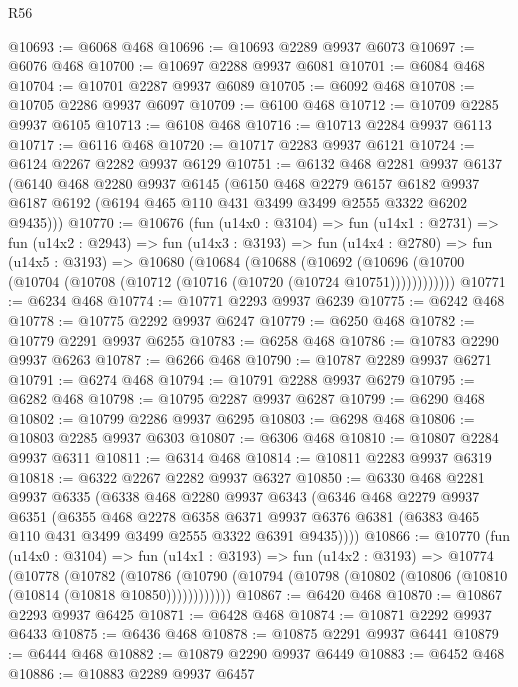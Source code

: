 \begin{lexlean}{R56}
\begin{coremodule}
@10693 := @6068 @468
@10696 := @10693 @2289 @9937 @6073
@10697 := @6076 @468
@10700 := @10697 @2288 @9937 @6081
@10701 := @6084 @468
@10704 := @10701 @2287 @9937 @6089
@10705 := @6092 @468
@10708 := @10705 @2286 @9937 @6097
@10709 := @6100 @468
@10712 := @10709 @2285 @9937 @6105
@10713 := @6108 @468
@10716 := @10713 @2284 @9937 @6113
@10717 := @6116 @468
@10720 := @10717 @2283 @9937 @6121
@10724 := @6124 @2267 @2282 @9937 @6129
@10751 := @6132
    @468
    @2281
    @9937
    @6137
    (@6140
      @468
      @2280
      @9937
      @6145
      (@6150
        @468
        @2279
        @6157
        @6182
        @9937
        @6187
        @6192
        (@6194 @465 @110 @431 @3499 @3499 @2555 @3322 @6202 @9435)))
@10770 := @10676
    (fun (u14x0 : @3104) =>
    fun (u14x1 : @2731) =>
    fun (u14x2 : @2943) =>
    fun (u14x3 : @3193) =>
    fun (u14x4 : @2780) =>
    fun (u14x5 : @3193) =>
    @10680
      (@10684
        (@10688
          (@10692 (@10696 (@10700 (@10704 (@10708 (@10712 (@10716 (@10720 (@10724 @10751))))))))))))
@10771 := @6234 @468
@10774 := @10771 @2293 @9937 @6239
@10775 := @6242 @468
@10778 := @10775 @2292 @9937 @6247
@10779 := @6250 @468
@10782 := @10779 @2291 @9937 @6255
@10783 := @6258 @468
@10786 := @10783 @2290 @9937 @6263
@10787 := @6266 @468
@10790 := @10787 @2289 @9937 @6271
@10791 := @6274 @468
@10794 := @10791 @2288 @9937 @6279
@10795 := @6282 @468
@10798 := @10795 @2287 @9937 @6287
@10799 := @6290 @468
@10802 := @10799 @2286 @9937 @6295
@10803 := @6298 @468
@10806 := @10803 @2285 @9937 @6303
@10807 := @6306 @468
@10810 := @10807 @2284 @9937 @6311
@10811 := @6314 @468
@10814 := @10811 @2283 @9937 @6319
@10818 := @6322 @2267 @2282 @9937 @6327
@10850 := @6330
    @468
    @2281
    @9937
    @6335
    (@6338
      @468
      @2280
      @9937
      @6343
      (@6346
        @468
        @2279
        @9937
        @6351
        (@6355
          @468
          @2278
          @6358
          @6371
          @9937
          @6376
          @6381
          (@6383 @465 @110 @431 @3499 @3499 @2555 @3322 @6391 @9435))))
@10866 := @10770
    (fun (u14x0 : @3104) =>
    fun (u14x1 : @3193) =>
    fun (u14x2 : @3193) =>
    @10774
      (@10778
        (@10782
          (@10786 (@10790 (@10794 (@10798 (@10802 (@10806 (@10810 (@10814 (@10818 @10850))))))))))))
@10867 := @6420 @468
@10870 := @10867 @2293 @9937 @6425
@10871 := @6428 @468
@10874 := @10871 @2292 @9937 @6433
@10875 := @6436 @468
@10878 := @10875 @2291 @9937 @6441
@10879 := @6444 @468
@10882 := @10879 @2290 @9937 @6449
@10883 := @6452 @468
@10886 := @10883 @2289 @9937 @6457

\end{coremodule}
\end{lexlean}
